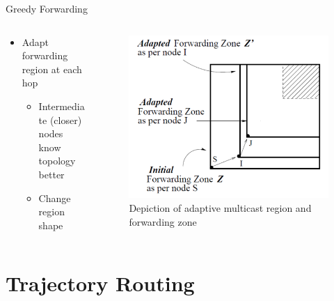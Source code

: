 \documentclass[pdftex]{beamer}
\begin{document}
\begin{frame}{Greedy Forwarding}
\begin{columns}
\begin{column}{.5\textwidth}
\begin{itemize}
	\item Adapt forwarding region at each hop \cite{749282}
		\begin{itemize}
			\item Intermediate (closer) nodes know topology better
			\item Change region shape
		\end{itemize}
\end{itemize}
\end{column}

\begin{column}{.5\textwidth}
\begin{figure}
\includegraphics[width=\textwidth]{adaptive_geocast_region}
\caption{Depiction of adaptive multicast region and forwarding zone}
\end{figure}
\end{column}
\end{columns}
\end{frame}


\section{Trajectory Routing}
\end{document}
